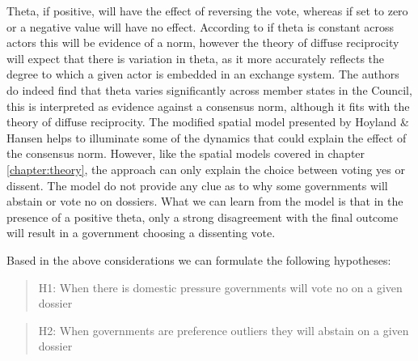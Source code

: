 Theta, if positive, will have the effect of reversing the vote, whereas if set to zero or a negative value will have no effect. According to \citet{HoylandHansen2010} if theta is constant across actors this will be evidence of a norm, however the theory of diffuse reciprocity will expect that there is variation in theta, as it more accurately reflects the degree to which a given actor is embedded in an exchange system. The authors do indeed find that theta varies significantly across member states in the Council, this is interpreted as evidence against a consensus norm, although it fits with the theory of diffuse reciprocity. The modified spatial model presented by Hoyland \& Hansen helps to illuminate some of the dynamics that could explain the effect of the consensus norm. However, like the spatial models covered in chapter \ref{chapter:theory}, the approach can only explain the choice between voting yes or dissent. The model do not provide any clue as to why some governments will abstain or vote no on dossiers. What we can learn from the model is that in the presence of a positive theta, only a strong disagreement with the final outcome will result in a government choosing a dissenting vote. 

Based in the above considerations we can formulate the following hypotheses:

\begin{quote}
  H1: When there is domestic pressure governments will vote no on a given dossier
\end{quote}

\begin{quote}
  H2: When governments are preference outliers they will abstain on a given dossier
\end{quote}

